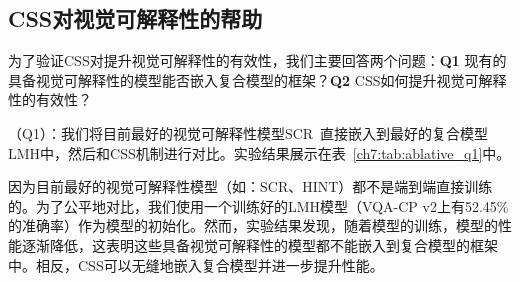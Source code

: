 \begin{table}[tbp]
    \begin{center}
    \end{center}
    \caption{不同视觉问答模型在VQA-CP v1上的性能对比}
    \label{ch7:tab:SOTA_v1}
\end{table}


\subsection{CSS对视觉可解释性的帮助}

为了验证CSS对提升视觉可解释性的有效性，我们主要回答两个问题：\textbf{Q1} 现有的具备视觉可解释性的模型能否嵌入复合模型的框架？\textbf{Q2} CSS如何提升视觉可解释性的有效性？

\textbf{}（Q1）：我们将目前最好的视觉可解释性模型SCR~\cite{wu2019self}直接嵌入到最好的复合模型LMH中，然后和CSS机制进行对比。实验结果展示在表~\ref{ch7:tab:ablative_q1}中。

因为目前最好的视觉可解释性模型（如：SCR、HINT）都不是端到端直接训练的。为了公平地对比，我们使用一个训练好的LMH模型（VQA-CP v2上有52.45\%的准确率）作为模型的初始化。然而，实验结果发现，随着模型的训练，模型的性能逐渐降低，这表明这些具备视觉可解释性的模型都不能嵌入到复合模型的框架中。相反，CSS可以无缝地嵌入复合模型并进一步提升性能。


